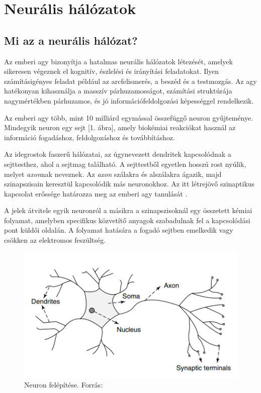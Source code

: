 \documentclass[12pt,a4]{article}
\begin{document}
	\section{Neurális hálózatok}
	\subsection{Mi az a neurális hálózat?}
	\label{NN}
	Az emberi agy bizonyítja a hatalmas neurális hálózatok \cite{ann} létezését, amelyek sikeresen végeznek el kognitív, észlelési és irányítási feladatokat. Ilyen számításigényes feladat például az arcfelismerés, a beszéd és a testmozgás. Az agy hatékonyan kihasználja a masszív párhuzamosságot, számítási struktúrája nagymértékben párhuzamos, és jó információfeldolgozási képességgel rendelkezik.
	
	Az emberi agy több, mint 10 milliárd egymással összefüggő neuron gyűjteménye. Mindegyik neuron egy sejt [1. ábra], amely biokémiai reakciókat használ az információ fogadáshoz, feldolgozáshoz és továbbításhoz.
	
	Az idegrostok faszerű hálózatai, az úgynevezett dendritek kapcsolódnak a sejttesthez, ahol a sejtmag található. A sejttestből egyetlen hosszú rost nyúlik, melyet \textit{axon}nak neveznek. Az \textit{axon} szálakra és alszálakra ágazik, majd szinapszisain keresztül kapcsolódik más neuronokhoz. Az itt létrejövő szinaptikus kapcsolat erőssége határozza meg az emberi agy tanulását\cite{ann} .
	
	A jelek átvitele egyik neuronról a másikra a szinapszisoknál egy összetett kémiai folyamat, amelyben specifikus közvetítő anyagok szabadulnak fel a kapcsolódási pont küldői oldalán. A folyamat hatására a fogadó sejtben emelkedik vagy csökken az elektromos feszültség\cite{ann}.
	\begin{figure}[h]	
		\centering
		\includegraphics[width=1\linewidth]{neuron1}
		\caption{Neuron felépítése. 
			Forrás:\cite{ann}}
	\end{figure}
	\newpage
\end{document}
